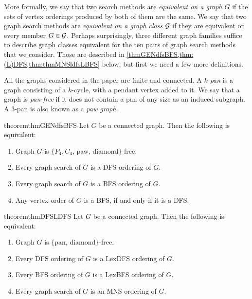 \documentclass{svproc}
\begin{document}
More formally, we say that two search methods are \emph{equivalent on a graph $G$} if the sets of vertex orderings produced by both of them are the same. 
We say that two graph search methods are \emph{equivalent on a graph class ${\cal G}$} if they are equivalent on every member $G\in {\cal G}$. 
Perhaps surprisingly, three different graph families suffice to describe graph classes equivalent for the ten pairs of graph search methods that we consider.
Those are described in \cref{thmGENdfsBFS,thm:(L)DFS,thm:thmMNSldfsLBFS}
below, but first we need a few more definitions.

All the graphs considered in the paper are finite and connected.
A \emph{$k$-pan} is a graph consisting of a $k$-cycle, with a pendant vertex added to it. We say that a graph is \emph{pan-free} if it does not contain a pan of any size as an induced subgraph. A $3$-pan is also known as a \emph{paw graph}.

\begin{restatable}{theorem}{thmGENdfsBFS}
\label{thmGENdfsBFS}Let $G$ be a connected graph. Then the following is equivalent: 
\begin{enumerate}[nosep, labelindent=\parindent,leftmargin=*, label = A\arabic*.]
    \item \label{it:gen4}Graph $G$ is $\{P_4, C_4$, paw, diamond$\}$-free.
    \item \label{it:gen1}Every graph search of $G$ is a DFS ordering of $G$.
    \item \label{it:gen2}Every graph search of $G$ is a BFS ordering of $G$.
    \item \label{it:bfsDfs}Any vertex-order of $G$ is a BFS, if and only if it is a DFS.
    
 \end{enumerate}
\end{restatable}

\begin{restatable}{theorem}{thmDFSLDFS}
\label{thm:(L)DFS}
Let $G$ be a connected graph. Then the following is equivalent:  
\begin{enumerate}[nosep, labelindent=\parindent,leftmargin=*, label = B\arabic*.]
    \item Graph $G$ is $\{$pan, diamond$\}$-free.
    \item Every DFS ordering of $G$ is a LexDFS ordering of $G$.
    \item Every BFS ordering of $G$ is a LexBFS ordering of $G$.
    \item Every graph search of $G$ is an MNS ordering of $G$. 
    
\end{enumerate}
\end{restatable}
\end{document}
